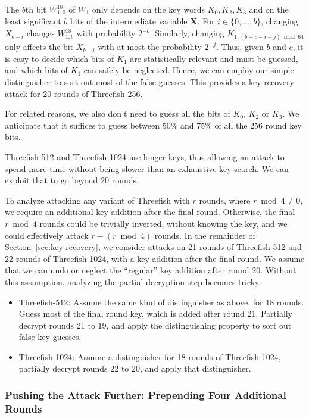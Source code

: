 \documentclass[11pt,twoside]{article}
\begin{document}
The $b$th bit $W^{18}_{1,0}$ of $W_1$ only depends on the key words $K_0, K_2, K_3$ and on the least significant $b$ bits of the intermediate variable \textbf{X}. For $i \in \{0, \ldots, b\}$, changing $X_{b-i}$ changes $W^{18}_{1,b}$ with probability $2^{-b}$. Similarly, changing $K_{1, (b-c-i-j)\bmod 64}$ only affects the bit $X_{b-i}$ with at most the probability $2^{-j}$. Thus, given $b$ and $c$, it is easy to decide which bits of $K_1$ are statistically relevant and must be guessed, and which bits of $K_1$ can safely be neglected.  Hence, we can employ our simple distinguisher to sort out most of the false guesses. This provides a key recovery attack for 20 rounds of Threefish-256.

For related reasons, we also don't need to guess all the bits of $K_0$, $K_2$ or $K_3$. We anticipate that it suffices to guess between 50\% and 75\% of all the 256 round key bits.

Threefish-512 and Threefish-1024 use longer keys, thus allowing an attack to spend more time without being slower than an exhaustive key search. We can exploit that to go beyond 20 rounds.

To analyze attacking any variant of Threefish with $r$ rounds, where $r \bmod 4 \neq 0$, we require an additional key addition after the final round. Otherwise, the final $r \bmod 4$ rounds could be trivially inverted, without knowing the key, and we could effectively attack $r-(r \bmod 4)$ rounds.
In the remainder of Section~\ref{sec:key-recovery}, we consider attacks on 21 rounds of Threefish-512 and 22 rounds of Threefish-1024, with a key addition after the final round. We assume that we can undo or neglect the ``regular'' key addition after round 20. Without this assumption, analyzing the partial decryption step becomes tricky.

\begin{itemize}
\item Threefish-512:  Assume the same kind of distinguisher as above, for 18 rounds.  Guess most of the final round key, which is added after round 21.  Partially decrypt rounds 21 to 19, and apply the distinguishing property to sort out false key guesses.

\item Threefish-1024: Assume a distinguisher for 18 rounds of Threefish-1024, partially decrypt rounds 22 to 20, and apply that distinguisher.
\end{itemize}

\subsubsection{Pushing the Attack Further: Prepending Four Additional Rounds}\label{sec:PushAttack}
\end{document}
